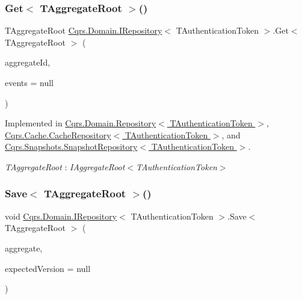 \subsubsection{\texorpdfstring{Get$<$ T\+Aggregate\+Root $>$()}{Get< TAggregateRoot >()}}
{\footnotesize\ttfamily T\+Aggregate\+Root \hyperlink{interfaceCqrs_1_1Domain_1_1IRepository}{Cqrs.\+Domain.\+I\+Repository}$<$ T\+Authentication\+Token $>$.Get$<$ T\+Aggregate\+Root $>$ (\begin{DoxyParamCaption}\item[{Guid}]{aggregate\+Id,  }\item[{I\+List$<$ \hyperlink{interfaceCqrs_1_1Events_1_1IEvent}{I\+Event}$<$ T\+Authentication\+Token $>$$>$}]{events = {\ttfamily null} }\end{DoxyParamCaption})}



Implemented in \hyperlink{classCqrs_1_1Domain_1_1Repository_ac83c06d643620a087232f5425d7ab1e3}{Cqrs.\+Domain.\+Repository$<$ T\+Authentication\+Token $>$}, \hyperlink{classCqrs_1_1Cache_1_1CacheRepository_ab0e3de3ba5dcfab8827fed714a8b8944}{Cqrs.\+Cache.\+Cache\+Repository$<$ T\+Authentication\+Token $>$}, and \hyperlink{classCqrs_1_1Snapshots_1_1SnapshotRepository_acdbea47afc87de1da613a6eff3ceef0f}{Cqrs.\+Snapshots.\+Snapshot\+Repository$<$ T\+Authentication\+Token $>$}.

\begin{Desc}
\item[Type Constraints]\begin{description}
\item[{\em T\+Aggregate\+Root} : {\em I\+Aggregate\+Root$<$T\+Authentication\+Token$>$}]\end{description}
\end{Desc}
\mbox{\label{interfaceCqrs_1_1Domain_1_1IRepository_a6086f15a0fef4982da553d24aee04015}} 
\subsubsection{\texorpdfstring{Save$<$ T\+Aggregate\+Root $>$()}{Save< TAggregateRoot >()}}
{\footnotesize\ttfamily void \hyperlink{interfaceCqrs_1_1Domain_1_1IRepository}{Cqrs.\+Domain.\+I\+Repository}$<$ T\+Authentication\+Token $>$.Save$<$ T\+Aggregate\+Root $>$ (\begin{DoxyParamCaption}\item[{T\+Aggregate\+Root}]{aggregate,  }\item[{int?}]{expected\+Version = {\ttfamily null} }\end{DoxyParamCaption})}



